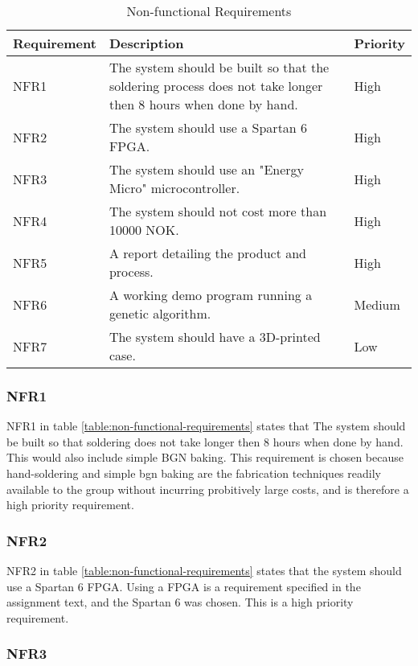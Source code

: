 \begin{table}[H]
\begin{center}
\begin{tabular}{| l | p{7cm} | l |}
\hline
Requirement & Description & Priority \\
\hline
NFR1 & The system should be built so that the soldering process does not take longer then 8 hours when done by hand. & High \\
NFR2 & The system should use a Spartan 6 FPGA. & High\\
NFR3 & The system should use an "Energy Micro" microcontroller. & High \\
NFR4 & The system should not cost more than 10000 NOK. & High \\
NFR5 & A report detailing the product and process. & High \\
NFR6 & A working demo program running a genetic algorithm. & Medium \\
NFR7 & The system should have a 3D-printed case. & Low \\
\hline
\end{tabular}
\caption{Non-functional Requirements}
\label{table:non-functional-requirements}
\end{center}
\end{table}

\subsubsection{NFR1}

NFR1 in table \vref{table:non-functional-requirements} states that The system should be built so that soldering does not take longer then 8 hours when done by hand. This would also include simple BGN baking.
This requirement is chosen because hand-soldering and simple bgn baking are the fabrication techniques readily available to the group without incurring probitively large costs, and is therefore a high priority requirement.

\subsubsection{NFR2}

NFR2 in table \vref{table:non-functional-requirements} states that the system should use a Spartan 6 FPGA.
Using a FPGA is a requirement specified in the assignment text, and the Spartan 6 was chosen. This is a high priority requirement. 

\subsubsection{NFR3}

